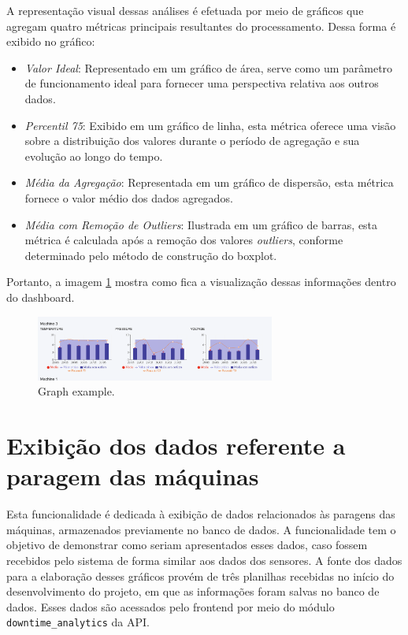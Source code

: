 A representação visual dessas análises é efetuada por meio de gráficos que agregam quatro métricas principais resultantes do processamento. Dessa forma é exibido no gráfico:

\begin{itemize}
    \item \textit{Valor Ideal}: Representado em um gráfico de área, serve como um parâmetro de funcionamento ideal para fornecer uma perspectiva relativa aos outros dados.
    \item \textit{Percentil 75}: Exibido em um gráfico de linha, esta métrica oferece uma visão sobre a distribuição dos valores durante o período de agregação e sua evolução ao longo do tempo.
    \item \textit{Média da Agregação}: Representada em um gráfico de dispersão, esta métrica fornece o valor médio dos dados agregados.
    \item \textit{Média com Remoção de \textit{Outliers}}: Ilustrada em um gráfico de barras, esta métrica é calculada após a remoção dos valores \textit{outliers}, conforme determinado pelo método de construção do boxplot.
\end{itemize}

Portanto, a imagem \ref{fig:graphData} mostra como fica a visualização dessas informações dentro do dashboard.

\begin{figure}[htbp]
	\centering
	\includegraphics[width=0.7\textwidth]{images/graphData.png}
	\caption{Graph example.}
	\label{fig:graphData}
\end{figure}

\section[Exibição dos dados referente a paragem das máquinas]{Exibição dos dados referente a paragem das máquinas}\label{sec:downtime}

Esta funcionalidade é dedicada à exibição de dados relacionados às paragens das máquinas, armazenados previamente no banco de dados. A funcionalidade tem o objetivo de demonstrar como seriam apresentados esses dados, caso fossem recebidos pelo sistema de forma similar aos dados dos sensores. A fonte dos dados para a elaboração desses gráficos provém de três planilhas recebidas no início do desenvolvimento do projeto, em que as informações foram salvas no banco de dados. Esses dados são acessados pelo frontend por meio do módulo \texttt{downtime\_analytics} da \gls{API}.

